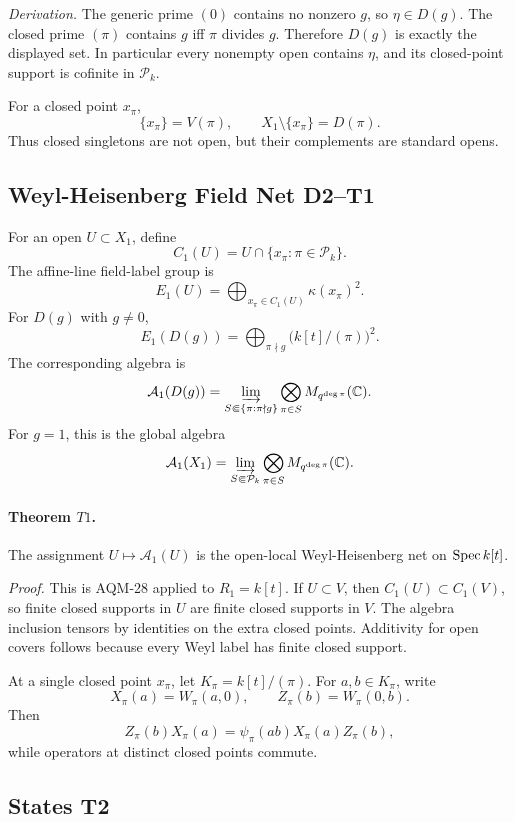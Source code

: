\emph{Derivation.}
The generic prime \((0)\) contains no nonzero \(g\), so \(\eta\in D(g)\).
The closed prime \((\pi)\) contains \(g\) iff \(\pi\) divides \(g\).  Therefore
\(D(g)\) is exactly the displayed set.  In particular every nonempty open
contains \(\eta\), and its closed-point support is cofinite in
\(\mathcal P_k\).

For a closed point \(x_\pi\),
\[
  \{x_\pi\}=V(\pi),\qquad
  X_1\setminus\{x_\pi\}=D(\pi).
\]
Thus closed singletons are not open, but their complements are standard opens.

\subsection{Weyl-Heisenberg Field Net D2--T1}

For an open \(U\subset X_1\), define
\[
  C_1(U)=U\cap\{x_\pi:\pi\in\mathcal P_k\}.
\]
The affine-line field-label group is
\[
  E_1(U)=\bigoplus_{x_\pi\in C_1(U)}\kappa(x_\pi)^2.
\]
For \(D(g)\) with \(g\ne0\),
\[
  E_1(D(g))=
  \bigoplus_{\pi\nmid g}\bigl(k[t]/(\pi)\bigr)^2.
\]
The corresponding algebra is
\[
  \mathcal A_1(D(g))=
  \varinjlim_{S\Subset\{\pi:\pi\nmid g\}}
  \bigotimes_{\pi\in S}M_{q^{\deg\pi}}(\mathbb C).
\]
For \(g=1\), this is the global algebra
\[
  \mathcal A_1(X_1)=
  \varinjlim_{S\Subset\mathcal P_k}
  \bigotimes_{\pi\in S}M_{q^{\deg\pi}}(\mathbb C).
\]

\paragraph{Theorem \(T1\).}
The assignment \(U\mapsto\mathcal A_1(U)\) is the open-local
Weyl-Heisenberg net on \(\operatorname{Spec} k[t]\).

\emph{Proof.}
This is AQM-28 applied to \(R_1=k[t]\).  If \(U\subset V\), then
\(C_1(U)\subset C_1(V)\), so finite closed supports in \(U\) are finite closed
supports in \(V\).  The algebra inclusion tensors by identities on the extra
closed points.  Additivity for open covers follows because every Weyl label
has finite closed support.

At a single closed point \(x_\pi\), let \(K_\pi=k[t]/(\pi)\).  For
\(a,b\in K_\pi\), write
\[
  X_\pi(a)=W_\pi(a,0),\qquad Z_\pi(b)=W_\pi(0,b).
\]
Then
\[
  Z_\pi(b)X_\pi(a)
  =
  \psi_\pi(ab)X_\pi(a)Z_\pi(b),
\]
while operators at distinct closed points commute.

\subsection{States T2}

